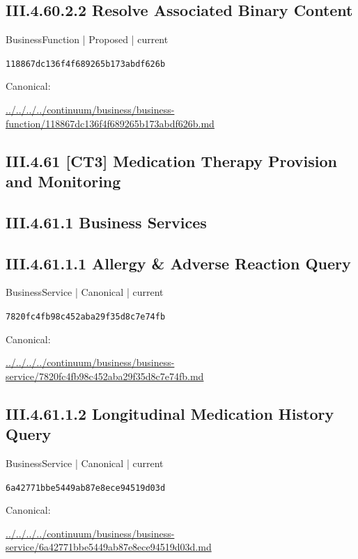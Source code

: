 \documentclass[10pt,a4paper]{article}
\begin{document}
\subsection*{III.4.60.2.2 Resolve Associated Binary Content}
{\small BusinessFunction | Proposed | current}\par
\texttt{118867dc136f4f689265b173abdf626b}\par
Canonical: \par
{\footnotesize\url{../../../../continuum/business/business-function/118867dc136f4f689265b173abdf626b.md}}\par
\subsection*{III.4.61 [CT3] Medication Therapy Provision and Monitoring}
\subsection*{III.4.61.1 Business Services}
\subsection*{III.4.61.1.1 Allergy \& Adverse Reaction Query}
{\small BusinessService | Canonical | current}\par
\texttt{7820fc4fb98c452aba29f35d8c7e74fb}\par
Canonical: \par
{\footnotesize\url{../../../../continuum/business/business-service/7820fc4fb98c452aba29f35d8c7e74fb.md}}\par
\subsection*{III.4.61.1.2 Longitudinal Medication History Query}
{\small BusinessService | Canonical | current}\par
\texttt{6a42771bbe5449ab87e8ece94519d03d}\par
Canonical: \par
{\footnotesize\url{../../../../continuum/business/business-service/6a42771bbe5449ab87e8ece94519d03d.md}}\par
\end{document}
